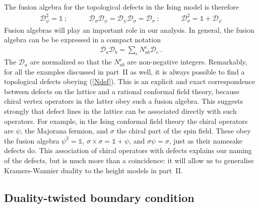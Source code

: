 \documentclass[11pt]{article}
\newcommand{\D}{{\mathcal{D}}}
\numberwithin{equation}{section}		%
\begin{document}
The fusion algebra for the topological defects in the Ising model is therefore
\begin{align}
{\mathcal D}_\psi^2=\mathds{1}\ ;\qquad\quad  \mathcal{D}_\sigma \mathcal{D}_{\psi} =\mathcal{D}_\psi \mathcal{D}_{\sigma} =  \mathcal{D}_\sigma\ ;\qquad\quad
 \mathcal{D}_{\sigma}^2 = \mathds{1} + \mathcal{D}_{\psi}
\label{fusionalgebra}
\end{align}
Fusion algebras will play an important role in our analysis. In general,
the fusion algebra can be be expressed in a compact notation
\begin{align}
\D_a \D_b = \sum_c N_{ab}^c \D_c\ .
\label{Ndef}
\end{align}
The $\D_a$ are normalized so that the  $N_{ab}^c $ are non-negative integers. Remarkably, for all the examples discussed in part~II as well, it is always possible to find a topological defects obeying (\ref{Ndef}). This is an explicit and exact correspondence between defects on the lattice and a rational conformal field theory, because chiral vertex operators in the latter obey such a fusion algebra. This suggests strongly that defect lines in the lattice can be associated directly with such operators. For example, in the Ising conformal field theory the chiral operators are $\psi$, the Majorana fermion,  and $\sigma$ the chiral part of the spin field. These obey the fusion algebra $\psi^2=\mathds{1}$, $\sigma\times\sigma = \mathds{1} +\psi$, and $\sigma\psi=\sigma$, just as their namesake defects do. This association of chiral operators with defects explains our naming of the defects, but is much more than a coincidence: it will allow us to generalise Kramers-Wannier duality to the height models in part~II.


\subsection{Duality-twisted boundary condition}
\label{sec:dualitybc}
\end{document}
